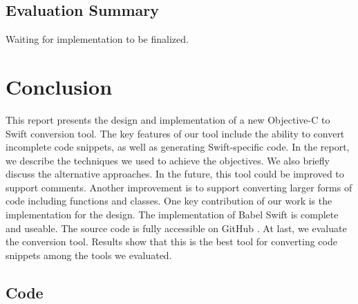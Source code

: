\documentclass{sfuthesis}
\begin{document}
\section{Evaluation Summary}

Waiting for implementation to be finalized.

\chapter{Conclusion}

This report presents the design and implementation of a new Objective-C to Swift conversion tool. The key features of our tool include the ability to convert incomplete code snippets, as well as generating Swift-specific code. In the report, we describe the techniques we used to achieve the objectives. We also briefly discuss the alternative approaches. In the future, this tool could be improved to support comments. Another improvement is to support converting larger forms of code including functions and classes.
One key contribution of our work is the implementation for the design. The implementation of Babel Swift is complete and useable. The source code is fully accessible on GitHub \cite{babelswift}. At last, we evaluate the conversion tool. Results show that this is the best tool for converting code snippets among the tools we evaluated.


%
%
%
%
%

\backmatter%
	
	

\begin{appendices} %
	\chapter{Code}
\end{appendices}
\end{document}
